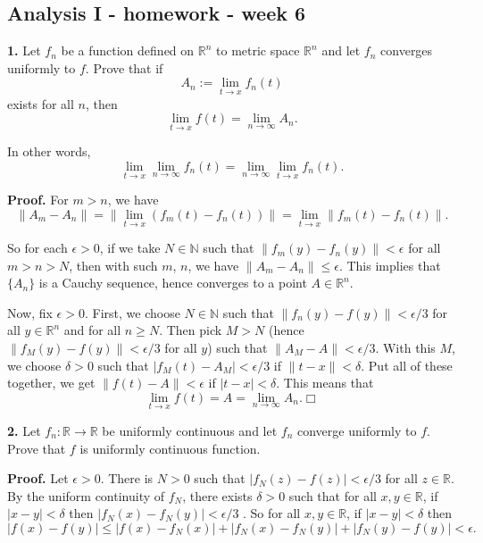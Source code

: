 \documentclass{article}
\begin{document}
    
    
    
    
    

    
    \subsection*{Analysis I - homework - week
6}\label{analysis-i---homework---week-6}

    \textbf{1.} Let $f_n$ be a function defined on $\mathbb{R}^n$ to metric
space $\mathbb{R}^n$ and let $f_n$ converges uniformly to $f$. Prove
that if \[
A_n := \lim_{t\to x}f_n(t)
\] exists for all $n$, then \[
\lim_{t\to x}f(t) = \lim_{n\to\infty}A_n.\]

In other words,
\[ \lim_{t\to x}\lim_{n\to\infty} f_n(t) = \lim_{n\to \infty}\lim_{t\to x}f_n(t).\]

\textbf{Proof.} For $m > n$, we have
\[ \|A_m - A_n\| = \|\lim_{t\to x} (f_m(t) - f_n(t))\| = \lim_{t\to x}\|f_m(t) - f_n(t)\|.\]

So for each $\epsilon > 0$, if we take $N\in\mathbb{N}$ such that
$\|f_m(y) - f_n(y)\| < \epsilon$ for all $m > n > N$, then with such
$m$, $n$, we have $\|A_m - A_n\| \le \epsilon$. This implies that
$\{A_n\}$ is a Cauchy sequence, hence converges to a point
$A\in \mathbb{R}^n$.

Now, fix $\epsilon > 0$. First, we choose $N\in\mathbb{N}$ such that
$\|f_n(y) -f(y)\| < \epsilon/3$ for all $y\in \mathbb{R}^n$ and for all
$n\ge N$. Then pick $M > N$ (hence $\|f_M(y)-f(y)\|<\epsilon /3$ for all
$y$) such that $\|A_M - A\| < \epsilon/3$. With this $M$, we choose
$\delta > 0$ such that $|f_M(t) - A_M| < \epsilon/3$ if
$\|t-x\| < \delta$. Put all of these together, we get
$\|f(t) - A\| < \epsilon$ if $|t-x| < \delta$. This means that
\[ \lim_{t\to x}f(t) = A = \lim_{n\to\infty} A_n. \Box\]

    \textbf{2.} Let $f_n:\mathbb{R}\to \mathbb{R}$ be uniformly continuous
and let $f_n$ converge uniformly to $f$. Prove that $f$ is uniformly
continuous function.

\textbf{Proof.} Let $\epsilon > 0$. There is $N>0$ such that
$|f_N(z) - f(z)| < \epsilon /3$ for all $z\in \mathbb{R}$. By the
uniform continuity of $f_N$, there exists $\delta > 0$ such that for all
$x,y \in \mathbb{R}$, if $|x-y| < \delta$ then
$|f_N(x) - f_N(y)| < \epsilon /3$ . So for all $x, y\in \mathbb{R}$, if
$|x - y| < \delta$ then
\[ |f(x) - f(y)| \le |f(x) -f_N(x)| + |f_N(x) - f_N(y)| + |f_N(y) - f(y)| < \epsilon.\]
\end{document}
